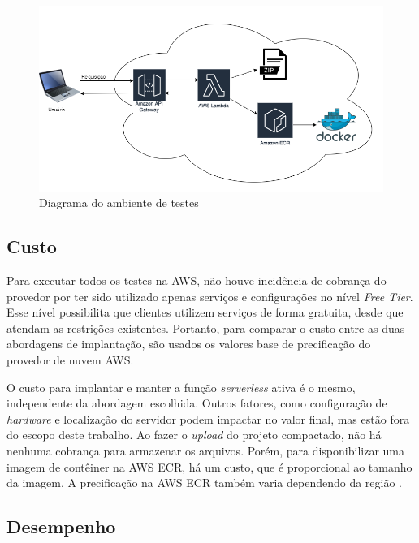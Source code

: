 \documentclass[conference]{IEEEtran}
\begin{document}
\begin{figure}[H]
    \centering 
    \includegraphics [width=\linewidth]{images/environment-diagram-PT.png}
    \par
    \caption{Diagrama do ambiente de testes}
    \label{fig:env_diagram}
\end{figure}

\subsection{Custo}
\label{subsec:cost}

Para executar todos os testes na AWS, não houve incidência de cobrança do provedor por ter sido utilizado apenas serviços e configurações no nível \textit{Free Tier}. Esse nível possibilita que clientes utilizem serviços de forma gratuita, desde que atendam as restrições existentes. Portanto, para comparar o custo entre as duas abordagens de implantação, são usados os valores base de precificação do provedor de nuvem AWS.

O custo para implantar e manter a função \textit{serverless} ativa é o mesmo, independente da abordagem escolhida. Outros fatores, como configuração de \textit{hardware} e localização do servidor podem impactar no valor final, mas estão fora do escopo deste trabalho.
Ao fazer o \textit{upload} do projeto compactado, não há nenhuma cobrança para armazenar os arquivos. Porém, para disponibilizar uma imagem de contêiner na AWS ECR, há um custo, que é proporcional ao tamanho da imagem. A precificação na AWS ECR também varia dependendo da região \cite{aws_2023_ecr_pricing}. 

\subsection{Desempenho}
\label{subsec:performance}
\end{document}

